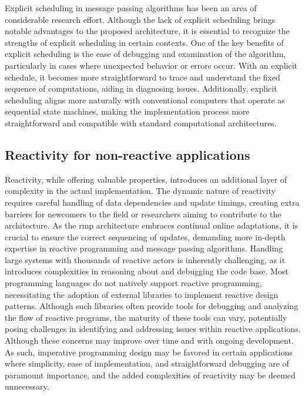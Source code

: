 Explicit scheduling in message passing algorithms has been an area of considerable research
effort.
Although the lack of explicit scheduling brings notable advantages to the proposed architecture, 
it is essential to recognize the strengths of explicit scheduling in certain contexts.
One of the key benefits of explicit scheduling is the ease of debugging and examination of the
algorithm, particularly in cases where unexpected behavior or errors occur.
With an explicit schedule, it becomes more straightforward to trace and understand the fixed sequence of computations, aiding in diagnosing issues. 
Additionally, explicit scheduling aligns more naturally with conventional computers that
operate as sequential state machines, making the implementation process more straightforward and
compatible with standard computational architectures.

\subsection{Reactivity for non-reactive applications}

Reactivity, while offering valuable properties, introduces an additional layer of complexity in the actual implementation.
The dynamic nature of reactivity requires careful handling of data dependencies and update
timings, creating extra barriers for newcomers to the field or researchers aiming to
contribute to the architecture.
As the \ac{rmp} architecture embraces continual online adaptations, it is crucial to ensure the correct sequencing of updates, demanding more in-depth expertise in reactive programming and message passing algorithms.
Handling large systems with thousands of reactive actors is inherently challenging, as it
introduces complexities in reasoning about and debugging the code base. 
Most programming languages do not natively support reactive programming, necessitating the
adoption of external libraries to implement reactive design patterns.
Although such libraries often provide tools for debugging and analyzing the flow of reactive
programs, the maturity of these tools can vary, potentially posing challenges in identifying
and addressing issues within reactive applications.
Although these concerns may improve over time and with ongoing development.
As such, imperative programming design may be favored in certain applications where simplicity, 
ease of implementation, and straightforward debugging are of paramount importance, and the added
complexities of reactivity may be deemed unnecessary. 

